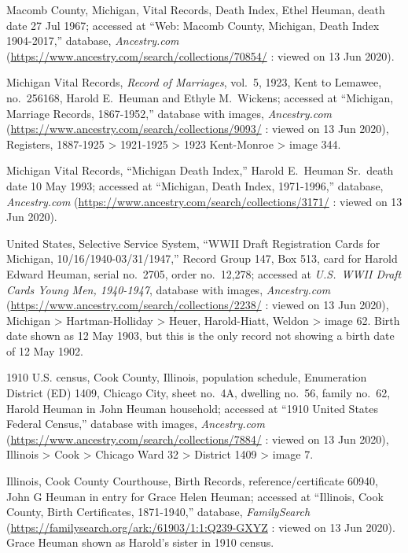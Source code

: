 \begin{thebibliography}{999}
Macomb County, Michigan, Vital Records, Death Index, Ethel Heuman, death date 27 Jul 1967; accessed at ``Web: Macomb County, Michigan, Death Index 1904-2017,'' database, \textit{Ancestry.com} (\url{https://www.ancestry.com/search/collections/70854/} : viewed on 13 Jun 2020).

Michigan Vital Records, \textit{Record of Marriages}, vol.\ 5, 1923, Kent to Lemawee, no.\ 256168, Harold E.\ Heuman and Ethyle M.\ Wickens; accessed at ``Michigan, Marriage Records, 1867-1952,'' database with images, \textit{Ancestry.com} (\url{https://www.ancestry.com/search/collections/9093/} : viewed on 13 Jun 2020),  Registers, 1887-1925 > 1921-1925 > 1923 Kent-Monroe > image 344.

Michigan Vital Records, ``Michigan Death Index,'' Harold E.\ Heuman Sr.\, death date 10 May 1993; accessed at ``Michigan, Death Index, 1971-1996,'' database, \textit{Ancestry.com} (\url{https://www.ancestry.com/search/collections/3171/} : viewed on 13 Jun 2020).

United States, Selective Service System, ``WWII Draft Registration Cards for Michigan, 10/16/1940-03/31/1947,'' Record Group 147, Box 513, card for Harold Edward Heuman, serial no.\ 2705, order no.\ 12,278; accessed at \textit{U.S.\ WWII Draft Cards Young Men, 1940-1947}, database with images, \textit{Ancestry.com} (\url{https://www.ancestry.com/search/collections/2238/} : viewed on 13 Jun 2020), Michigan > Hartman-Holliday > Heuer, Harold-Hiatt, Weldon > image 62.
Birth date shown as 12 May 1903, but this is the only record not showing a birth date of 12 May 1902.

1910 U.S. census, Cook County, Illinois, population schedule, Enumeration District (ED) 1409, Chicago City, sheet no.\ 4A, dwelling no.\ 56, family no.\ 62, Harold Heuman in John Heuman household; accessed at ``1910 United States Federal Census,'' database with images, \textit{Ancestry.com} (\url{https://www.ancestry.com/search/collections/7884/} : viewed on 13 Jun 2020), Illinois > Cook > Chicago Ward 32 > District 1409 > image 7.

Illinois, Cook County Courthouse, Birth Records, reference/certificate 60940, John G Heuman in entry for Grace Helen Heuman; accessed at ``Illinois, Cook County, Birth Certificates, 1871-1940,'' database, \textit{FamilySearch} (\url{https://familysearch.org/ark:/61903/1:1:Q239-GXYZ} : viewed on 13 Jun 2020). Grace Heuman shown as Harold's sister in 1910 census.


\end{thebibliography}
